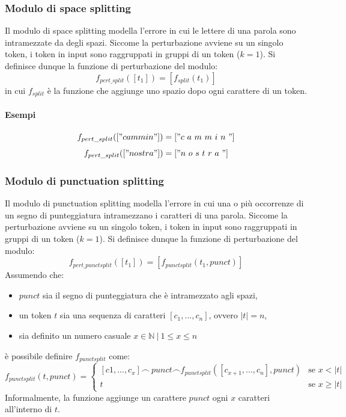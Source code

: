 \subsubsection{Modulo di space splitting}
Il modulo di space splitting modella l'errore in cui le lettere di una parola sono intramezzate da degli spazi. Siccome la perturbazione avviene su un singolo token, i token in input sono raggruppati in gruppi di un token ($k = 1$). Si definisce dunque la funzione di perturbazione del modulo:
\begin{equation}
f_{pert\_split}([t_1]) = [f_{split}(t_1)]
\end{equation}
in cui $f_{split}$ è la funzione che aggiunge uno spazio dopo ogni carattere di un token.
\paragraph{Esempi}
\begin{equation}
f_{pert\_split}(["cammin"]) = ["c\ a\ m\ m\ i\ n\ "]
\end{equation}
\begin{equation}
f_{pert\_split}(["nostra"]) = ["n\ o\ s\ t\ r\ a\ "]
\end{equation}

\subsubsection{Modulo di punctuation splitting}
Il modulo di punctuation splitting modella l'errore in cui una o più occorrenze di un segno di punteggiatura intramezzano i caratteri di una parola.
Siccome la perturbazione avviene su un singolo token, i token in input sono raggruppati in gruppi di un token ($k = 1$). Si definisce dunque la funzione di perturbazione del modulo:
\begin{equation}
f_{pert\_punctsplit}([t_1]) = [f_{punctsplit}(t_1,punct)]
\end{equation}
Assumendo che:
\begin{itemize}
\item $punct$ sia il segno di punteggiatura che è intramezzato agli spazi,
\item un token $t$ sia una sequenza di caratteri $[c_1,...,c_n]$, ovvero $|t| = n$,
\item sia definito un numero casuale $x \in \mathbb{N}\ |\ 1 \leq x \leq n$
\end{itemize}
è possibile definire $f_{punctsplit}$ come:
\begin{equation}
f_{punctsplit}(t,punct) = 
\begin{cases}
	[c1,...,c_x] \frown\ punct \frown f_{punctsplit}([c_{x+1},...,c_n],punct)&\text{se $x < |t|$}\\
	t	&\text{se $x \geqslant |t|$}
\end{cases}
\end{equation}
Informalmente, la funzione aggiunge un carattere $punct$ ogni $x$ caratteri all'interno di $t$.

